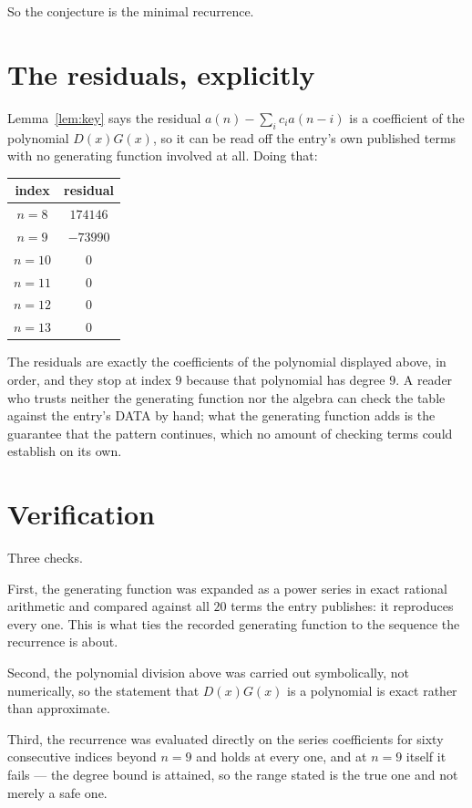 \documentclass[11pt,a4paper]{article}
\theoremstyle{plain}
\theoremstyle{definition}
\begin{document}
So the conjecture is the minimal recurrence.

\section{The residuals, explicitly}

Lemma~\ref{lem:key} says the residual $a(n)-\sum_ic_ia(n-i)$ is a coefficient of the
polynomial $D(x)G(x)$, so it can be read off the entry's own published terms with no
generating function involved at all. Doing that:
\begin{center}
\begin{tabular}{cc}
index & residual \\ \hline
$n=8$ & $174146$ \\
$n=9$ & $-73990$ \\
$n=10$ & $0$ \\
$n=11$ & $0$ \\
$n=12$ & $0$ \\
$n=13$ & $0$
\end{tabular}
\end{center}
The residuals are exactly the coefficients of the polynomial displayed above, in order, and
they stop at index $9$ because that polynomial has degree $9$. A reader who trusts
neither the generating function nor the algebra can check the table against the entry's DATA
by hand; what the generating function adds is the guarantee that the pattern continues, which
no amount of checking terms could establish on its own.

\section{Verification}

Three checks.

First, the generating function was expanded as a power series in exact rational arithmetic and
compared against all $20$ terms the entry publishes: it reproduces every one. This is
what ties the recorded generating function to the sequence the recurrence is about.

Second, the polynomial division above was carried out symbolically, not numerically, so the
statement that $D(x)G(x)$ is a polynomial is exact rather than approximate.

Third, the recurrence was evaluated directly on the series coefficients for sixty consecutive
indices beyond $n=9$ and holds at every one, and at $n=9$ itself it fails --- the
degree bound is attained, so the range stated is the true one and not merely a safe one.
\end{document}
